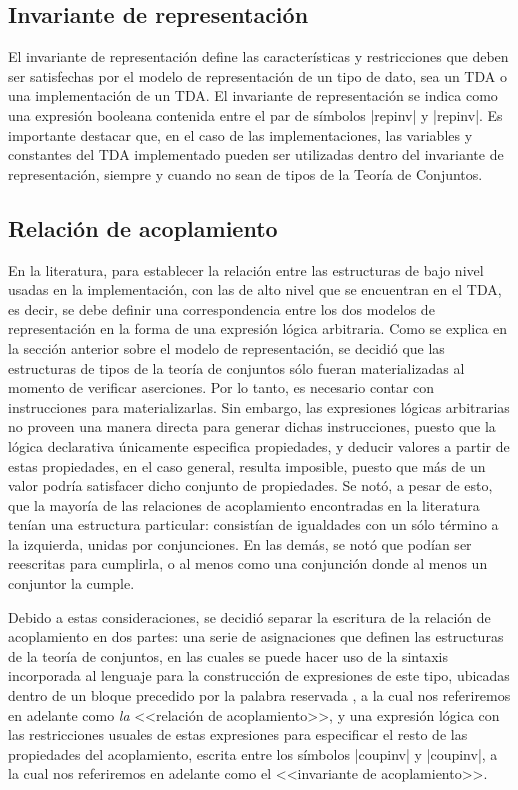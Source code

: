{{\subsection{Invariante de representación}

El invariante de representación define las características y restricciones que
deben ser satisfechas por el modelo de representación de un tipo de dato, sea un
TDA o una implementación de un TDA. El invariante de representación se indica
como una expresión booleana contenida entre el par de símbolos \ingra|{repinv|
y \ingra|repinv}|. Es importante destacar que, en el caso de las
implementaciones, las variables y constantes del TDA implementado pueden ser
utilizadas dentro del invariante de representación, siempre y cuando no sean de
tipos de la Teoría de Conjuntos.

\subsection{Relación de acoplamiento}

En la literatura, para establecer la relación entre las estructuras de bajo
nivel usadas en la implementación, con las de alto nivel que se encuentran en el
TDA, es decir, se debe definir una correspondencia entre los dos modelos de
representación en la forma de una expresión lógica arbitraria. Como se explica
en la sección anterior sobre el modelo de representación, se decidió que las
estructuras de tipos de la teoría de conjuntos sólo fueran materializadas al
momento de verificar aserciones. Por lo tanto, es necesario contar con
instrucciones para materializarlas. Sin embargo, las expresiones lógicas
arbitrarias no proveen una manera directa para generar dichas instrucciones,
puesto que la lógica declarativa únicamente especifica propiedades, y deducir
valores a partir de estas propiedades, en el caso general, resulta imposible,
puesto que más de un valor podría satisfacer dicho conjunto de propiedades. Se
notó, a pesar de esto, que la mayoría de las relaciones de acoplamiento
encontradas en la literatura tenían una estructura particular: consistían de
igualdades con un sólo término a la izquierda, unidas por conjunciones. En las
demás,  se notó que podían ser reescritas para cumplirla, o al menos como una
conjunción donde al menos un conjuntor la cumple.

Debido a estas consideraciones, se decidió separar la escritura de la relación
de acoplamiento en dos partes: una serie de asignaciones que definen las
estructuras de la teoría de conjuntos, en las cuales se puede hacer uso de la
sintaxis incorporada al lenguaje para la construcción de expresiones de este
tipo, ubicadas dentro de un bloque  precedido por la palabra reservada
, a la cual nos referiremos en adelante como \textit{la}
<<relación de acoplamiento>>, y una expresión lógica con las restricciones
usuales de estas expresiones para especificar el resto de las propiedades del
acoplamiento, escrita entre los símbolos \ingra|{coupinv| y
\ingra|coupinv}|, a la cual nos referiremos en adelante como el <<invariante
de acoplamiento>>.

}}
